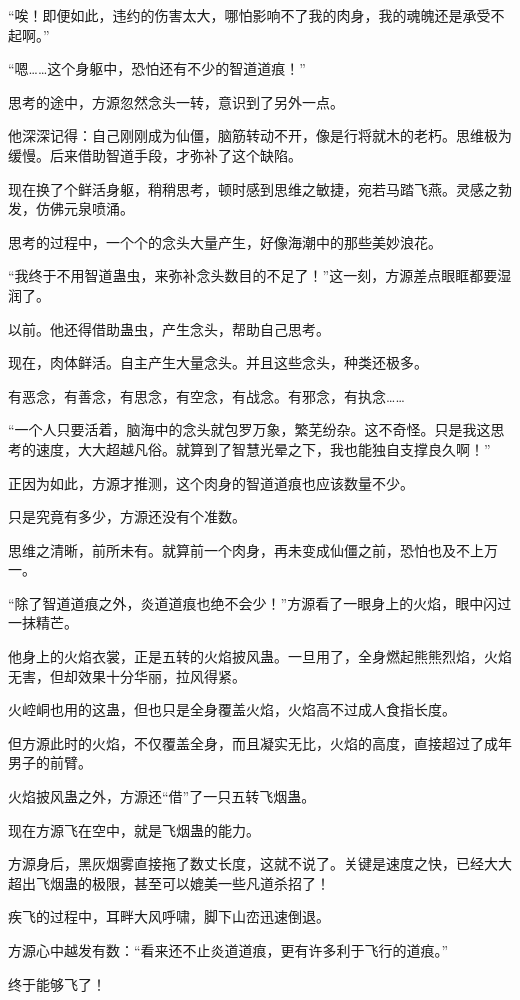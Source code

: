 \begin{this_body}
“唉！即便如此，违约的伤害太大，哪怕影响不了我的肉身，我的魂魄还是承受不起啊。”

“嗯……这个身躯中，恐怕还有不少的智道道痕！”

思考的途中，方源忽然念头一转，意识到了另外一点。

他深深记得：自己刚刚成为仙僵，脑筋转动不开，像是行将就木的老朽。思维极为缓慢。后来借助智道手段，才弥补了这个缺陷。

现在换了个鲜活身躯，稍稍思考，顿时感到思维之敏捷，宛若马踏飞燕。灵感之勃发，仿佛元泉喷涌。

思考的过程中，一个个的念头大量产生，好像海潮中的那些美妙浪花。

“我终于不用智道蛊虫，来弥补念头数目的不足了！”这一刻，方源差点眼眶都要湿润了。

以前。他还得借助蛊虫，产生念头，帮助自己思考。

现在，肉体鲜活。自主产生大量念头。并且这些念头，种类还极多。

有恶念，有善念，有思念，有空念，有战念。有邪念，有执念……

“一个人只要活着，脑海中的念头就包罗万象，繁芜纷杂。这不奇怪。只是我这思考的速度，大大超越凡俗。就算到了智慧光晕之下，我也能独自支撑良久啊！”

正因为如此，方源才推测，这个肉身的智道道痕也应该数量不少。

只是究竟有多少，方源还没有个准数。

思维之清晰，前所未有。就算前一个肉身，再未变成仙僵之前，恐怕也及不上万一。

“除了智道道痕之外，炎道道痕也绝不会少！”方源看了一眼身上的火焰，眼中闪过一抹精芒。

他身上的火焰衣裳，正是五转的火焰披风蛊。一旦用了，全身燃起熊熊烈焰，火焰无害，但却效果十分华丽，拉风得紧。

火崆峒也用的这蛊，但也只是全身覆盖火焰，火焰高不过成人食指长度。

但方源此时的火焰，不仅覆盖全身，而且凝实无比，火焰的高度，直接超过了成年男子的前臂。

火焰披风蛊之外，方源还“借”了一只五转飞烟蛊。

现在方源飞在空中，就是飞烟蛊的能力。

方源身后，黑灰烟雾直接拖了数丈长度，这就不说了。关键是速度之快，已经大大超出飞烟蛊的极限，甚至可以媲美一些凡道杀招了！

疾飞的过程中，耳畔大风呼啸，脚下山峦迅速倒退。

方源心中越发有数：“看来还不止炎道道痕，更有许多利于飞行的道痕。”

终于能够飞了！


\end{this_body}
